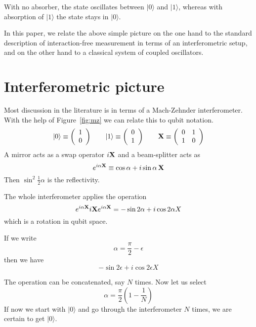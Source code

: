 \documentclass[12pt,aps,prb,preprint]{revtex4}
\def\ket#1{|#1\rangle}
\def\X{{\bf X}}
\begin{document}
With no absorber, the state oscillates between $\ket0$ and $\ket1$,
whereas with absorption of $\ket1$ the state stays in $\ket0$.

In this paper, we relate the above simple picture on the one hand to
the standard description of interaction-free measurement in terms of
an interferometric setup, and on the other hand to a classical system
of coupled oscillators.

\section{Interferometric picture}

Most discussion in the literature is in terms of a Mach-Zehnder
interferometer.  With the help of Figure~{\ref{fig:mz}} we can relate
this to qubit notation.
\begin{equation}
\ket0 \equiv \left( \begin{array}{c} 1 \\ 0 \end{array} \right)  \qquad
\ket1 \equiv \left( \begin{array}{c} 0 \\ 1 \end{array} \right)  \qquad
\X \equiv \left( \begin{array}{cc} 0 & 1 \\ 1 & 0 \end{array} \right)
\end{equation}
A mirror acts as a swap operator $i\X$ and a beam-splitter acts as
\begin{equation}
e^{i\alpha\X} \equiv \cos\alpha + i\sin\alpha\,\X
\end{equation}
Then $\sin^2\frac12\alpha$ is the reflectivity.

The whole interferometer applies the operation
\begin{equation}
e^{i\alpha\X} i\X e^{i\alpha\X} = -\sin2\alpha + i\cos2\alpha X
\end{equation}
which is a rotation in qubit space.

If we write
\begin{equation}
\alpha = \frac\pi2 - \epsilon
\end{equation}
then we have
\begin{equation}
-\sin2\epsilon + i\cos2\epsilon X
\end{equation}


The operation can be concatenated, say $N$ times.  Now let us select
\begin{equation}
\alpha = \frac\pi2 \left(1-\frac1N\right)
\end{equation}
If now we start with $\ket0$ and go through the interferometer $N$
times, we are certain to get $\ket0$.
\end{document}
